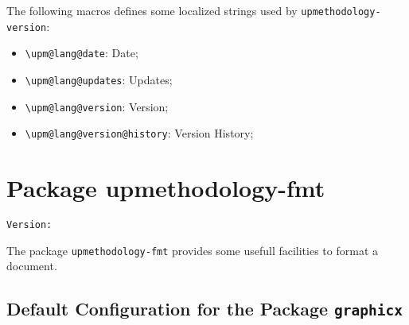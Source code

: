 \documentclass[book]{upmethodology-document}
\makeatletter
\let\VERfmt\upm@package@fmt@ver
\makeatother
\begin{document}
The following macros defines some localized strings used by \texttt{upmethodology-version}:
\begin{itemize}
\item \texttt{{\textbackslash}upm@lang@date}: Date;
\item \texttt{{\textbackslash}upm@lang@updates}: Updates;
\item \texttt{{\textbackslash}upm@lang@version}: Version;
\item \texttt{{\textbackslash}upm@lang@version@history}: Version History;
\end{itemize}


\chapter{Package upmethodology-fmt}

\begin{center}
	\texttt{Version: \VERfmt}
\end{center}

The package \texttt{upmethodology-fmt} provides some usefull facilities to format a document.

\section{Default Configuration for the Package \texttt{graphicx}}
\end{document}
